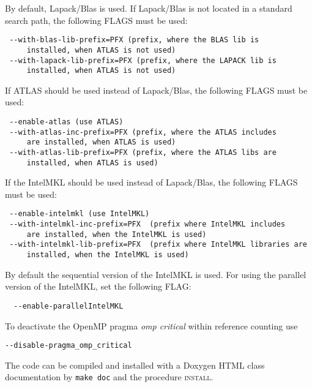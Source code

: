 By default, Lapack/Blas is used. If Lapack/Blas is not located in a standard search path, the following FLAGS must be used:
\begin{verbatim}
 --with-blas-lib-prefix=PFX (prefix, where the BLAS lib is
     installed, when ATLAS is not used)
 --with-lapack-lib-prefix=PFX (prefix, where the LAPACK lib is
     installed, when ATLAS is not used)
\end{verbatim}

If ATLAS should be used instead of Lapack/Blas, the following FLAGS must be used:
\begin{verbatim}
 --enable-atlas (use ATLAS)
 --with-atlas-inc-prefix=PFX (prefix, where the ATLAS includes 
     are installed, when ATLAS is used)
 --with-atlas-lib-prefix=PFX (prefix, where the ATLAS libs are
     installed, when ATLAS is used)
\end{verbatim}

If the IntelMKL should be used instead of Lapack/Blas, the following FLAGS must be used:
\begin{verbatim}
 --enable-intelmkl (use IntelMKL)
 --with-intelmkl-inc-prefix=PFX  (prefix where IntelMKL includes
     are installed, when the IntelMKL is used)
 --with-intelmkl-lib-prefix=PFX  (prefix where IntelMKL libraries are
     installed, when the IntelMKL is used)
\end{verbatim}

By default the sequential version of the IntelMKL is used. For using the parallel version of the IntelMKL, set the following FLAG:
\begin{verbatim}
  --enable-parallelIntelMKL
\end{verbatim}

To deactivate the OpenMP pragma \textit{omp critical} within reference counting use
\begin{verbatim}
--disable-pragma_omp_critical
\end{verbatim}
The code can be compiled and installed with a Doxygen HTML class documentation by \texttt{make doc} and the procedure \textsc{install}.

